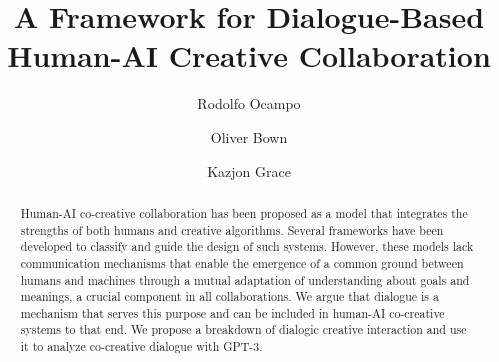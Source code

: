 \documentclass[acmlarge, nonacm, screen]{acmart} %
\begin{document}

\title{A Framework for Dialogue-Based Human-AI Creative Collaboration}


\author{Rodolfo Ocampo}
\email{}
\orcid{}
\author{Oliver Bown}
\authornotemark[1]
\email{}

\author{Kazjon Grace}


\renewcommand{\shortauthors}{Ocampo et al.}

\begin{abstract}
Human-AI co-creative collaboration has been proposed as a model that integrates the strengths of both humans and creative algorithms. Several frameworks have been developed to classify and guide the design of such systems. However, these models lack communication mechanisms that enable the emergence of a common ground between humans and machines through a mutual adaptation of understanding about goals and meanings, a crucial component in all collaborations. We argue that dialogue is a mechanism that serves this purpose and can be included in human-AI co-creative systems to that end. We propose a breakdown of dialogic creative interaction and use it to analyze co-creative dialogue with GPT-3. 
\end{abstract}
\end{document}
